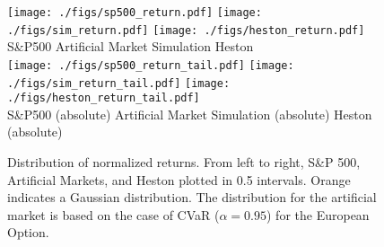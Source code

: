 \begin{figure*}[htb]
    \centering
    \texttt{[image: ./figs/sp500\_return.pdf]}
    \texttt{[image: ./figs/sim\_return.pdf]}
    \texttt{[image: ./figs/heston\_return.pdf]}\\
    S\&P500 \hspace{0.17\linewidth} Artificial Market Simulation \hspace{0.17\linewidth} Heston\\
    \texttt{[image: ./figs/sp500\_return\_tail.pdf]}
    \texttt{[image: ./figs/sim\_return\_tail.pdf]}
    \texttt{[image: ./figs/heston\_return\_tail.pdf]}\\
    S\&P500 (absolute) \hspace{0.09\linewidth} Artificial Market Simulation (absolute) \hspace{0.09\linewidth} Heston (absolute)\\
    \caption{Distribution of normalized returns. From left to right, S\&P 500, Artificial Markets, and Heston plotted in 0.5 intervals. Orange indicates a Gaussian distribution. The distribution for the artificial market is based on the case of CVaR ($\alpha=0.95$) for the European Option.}
    \label{fig:returns}
\end{figure*}
